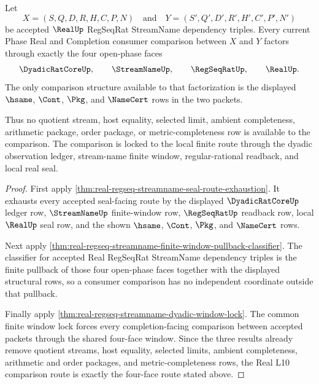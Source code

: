 \begin{theorem}
\label{thm:real-l10-four-face-route-lock}
Let
$$
X=(S,Q,D,R,H,C,P,N)
\quad\text{and}\quad
Y=(S',Q',D',R',H',C',P',N')
$$
be accepted $\RealUp$ RegSeqRat StreamName dependency triples. Every current
Phase Real and Completion consumer comparison between $X$ and $Y$ factors
through exactly the four open-phase faces
$$
\DyadicRatCoreUp,\qquad \StreamNameUp,\qquad
\RegSeqRatUp,\qquad \RealUp .
$$
The only comparison structure available to that factorization is the
displayed $\hsame$, $\Cont$, $\Pkg$, and $\NameCert$ rows in the two packets.

Thus no quotient stream, host equality, selected limit, ambient completeness,
arithmetic package, order package, or metric-completeness row is available to
the comparison. The comparison is locked to the local finite route through the
dyadic observation ledger, stream-name finite window, regular-rational
readback, and local real seal.
\end{theorem}
\begin{proof}
First apply
\autoref{thm:real-regseq-streamname-seal-route-exhaustion}. It exhausts every
accepted seal-facing route by the displayed $\DyadicRatCoreUp$ ledger row,
$\StreamNameUp$ finite-window row, $\RegSeqRatUp$ readback row, local
$\RealUp$ seal row, and the shown $\hsame$, $\Cont$, $\Pkg$, and $\NameCert$
rows.

Next apply
\autoref{thm:real-regseq-streamname-finite-window-pullback-classifier}. The
classifier for accepted Real RegSeqRat StreamName dependency triples is the
finite pullback of those four open-phase faces together with the displayed
structural rows, so a consumer comparison has no independent coordinate
outside that pullback.

Finally apply
\autoref{thm:real-regseq-streamname-dyadic-window-lock}. The common finite
window lock forces every completion-facing comparison between accepted packets
through the shared four-face window. Since the three results already remove
quotient streams, host equality, selected limits, ambient completeness,
arithmetic and order packages, and metric-completeness rows, the Real L10
comparison route is exactly the four-face route stated above.
\end{proof}

